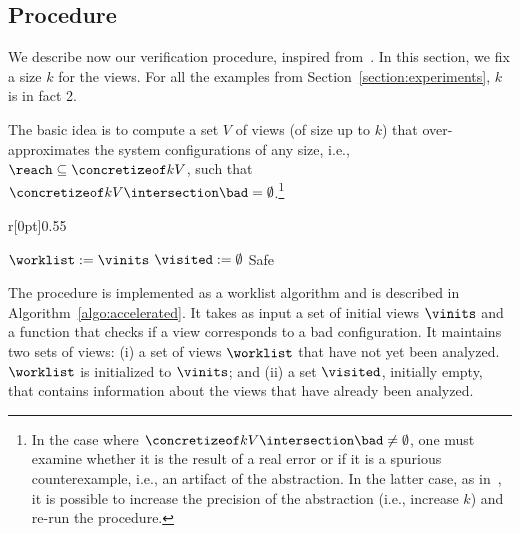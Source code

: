\subsection{Procedure}\label{section:procedure}

We describe now our verification procedure, inspired
from~\cite{AbHaHo:view:abstraction}. %
In this section, we fix a size $k$ for the views. For all the examples
from Section~\ref{section:experiments}, $k$ is in fact 2.

The basic idea is to compute a set $V$ of views (of size up to $k$)
that over-approximates the system configurations of any size, i.e.,
$\reach\subseteq\concretizeof k V$, such that $\concretizeof k V
\intersection \bad = \emptyset$.\footnote{%
%
  In the case where $\concretizeof k V \intersection \bad \neq
  \emptyset$, one must examine whether it is the result of a real
  error or if it is a spurious counterexample, i.e., an artifact of
  the abstraction. %
  In the latter case, as in~\cite{AbHaHo:view:abstraction}, it is
  possible to increase the precision of the abstraction (i.e.,
  increase $k$) and re-run the procedure.
%
} %
%

\noindent%
\begin{wrapfigure}{r}[0pt]{0.55\textwidth}
\vspace{-24pt}
\begin{minipage}{0.55\textwidth}
\begin{algorithm}[H]
\DontPrintSemicolon
\caption{Accelerated procedure}
\label{algo:accelerated}
$\worklist := \vinits$\;
$\visited := \emptyset$\;
\Return Safe
\end{algorithm}
\end{minipage}%
\vspace{-20pt}
\end{wrapfigure}
%
The procedure is implemented as a worklist algorithm and is described
in Algorithm~\ref{algo:accelerated}. %
It takes as input a set of initial views $\vinits$ and a function that
checks if a view corresponds to a bad configuration. %
It maintains two sets of views: %
(i) a set of views $\worklist$ that have not yet been analyzed. %
$\worklist$ is initialized to $\vinits$; and %
(ii) a set $\visited$, initially empty, that contains information
about the views that have already been analyzed.
%

